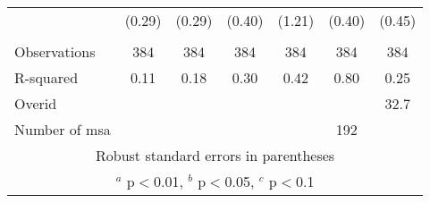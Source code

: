 \documentclass[]{article}
\begin{document}
\begin{tabular}{lcccccc}
 & (0.29) & (0.29) & (0.40) & (1.21) & (0.40) & (0.45) \\
 &  &  &  &  &  &  \\
Observations & 384 & 384 & 384 & 384 & 384 & 384 \\
R-squared & 0.11 & 0.18 & 0.30 & 0.42 & 0.80 & 0.25 \\
Overid &  &  &  &  &  & 32.7 \\
 Number of msa &  &  &  &  & 192 &  \\ \hline
\multicolumn{7}{c}{ Robust standard errors in parentheses} \\
\multicolumn{7}{c}{ $^a$ p$<$0.01, $^b$ p$<$0.05, $^c$ p$<$0.1} \\
\end{tabular}
\end{document}
